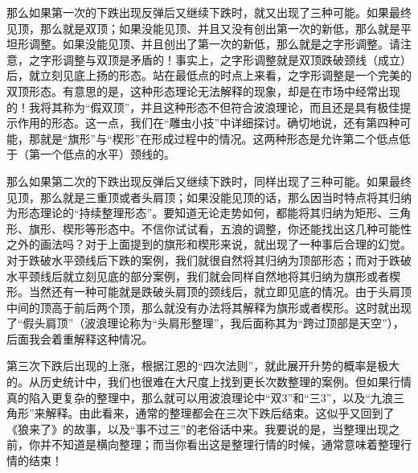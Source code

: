 那么如果第一次的下跌出现反弹后又继续下跌时，就又出现了三种可能。如果最终见顶，那么就是双顶；如果没能见顶、并且又没有创出第一次的新低，那么就是平坦形调整。如果没能见顶、并且创出了第一次的新低，那么就是之字形调整。请注意，之字形调整与双顶是矛盾的！事实上，之字形调整就是双顶跌破颈线（成立）后，就立刻见底上扬的形态。站在最低点的时点上来看，之字形调整是一个完美的双顶形态。有意思的是，这种形态理论无法解释的现象，却是在市场中经常出现的！我将其称为“假双顶”，并且这种形态不但符合波浪理论，而且还是具有极佳提示作用的形态。这一点，我们在“雕虫小技”中详细探讨。确切地说，还有第四种可能，那就是“旗形”与“楔形”在形成过程中的情况。这两种形态是允许第二个低点低于（第一个低点的水平）颈线的。












那么如果第二次的下跌出现反弹后又继续下跌时，同样出现了三种可能。如果最终见顶，那么就是三重顶或者头肩顶；如果没能见顶的话，那么因当时特点将其归纳为形态理论的“持续整理形态”。要知道无论走势如何，都能将其归纳为矩形、三角形、旗形、楔形等形态中。不信你试试看，五浪的调整，你还能找出这几种可能性之外的画法吗？对于上面提到的旗形和楔形来说，就出现了一种事后合理的幻觉。对于跌破水平颈线后下跌的案例，我们就很自然将其归纳为顶部形态；而对于跌破水平颈线后就立刻见底的部分案例，我们就会同样自然地将其归纳为旗形或者楔形。当然还有一种可能就是跌破头肩顶的颈线后，就立即见底的情况。由于头肩顶中间的顶高于前后两个顶，那么就没有办法将其解释为旗形或者楔形。这时就出现了“假头肩顶”（波浪理论称为“头肩形整理”，我后面称其为“跨过顶部是天空”），后面我会着重解释这种情况。













第三次下跌后出现的上涨，根据江恩的“四次法则”，就此展开升势的概率是极大的。从历史统计中，我们也很难在大尺度上找到更长次数整理的案例。但如果行情真的陷入更复杂的整理中，那么就可以用波浪理论中“双3”和“三3”，以及“九浪三角形”来解释。由此看来，通常的整理都会在三次下跌后结束。这似乎又回到了《狼来了》的故事，以及“事不过三”的老俗话中来。我要说的是，当整理出现之前，你并不知道是横向整理；而当你看出这是整理行情的时候，通常意味着整理行情的结束！

